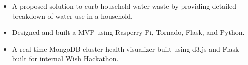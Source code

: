 \documentclass[10pt,a4paper,academicons]{altacv}
\begin{document}

\begin{itemize}
\item A proposed solution to curb household water waste by providing detailed breakdown of water use in a household.
\item Designed and built a MVP using Rasperry Pi, Tornado, Flask, and Python.
\end{itemize}
\divider

\begin{itemize}
\item A real-time MongoDB cluster health visualizer built using d3.js and Flask
    built for internal Wish Hackathon.
\end{itemize}
\end{document}
